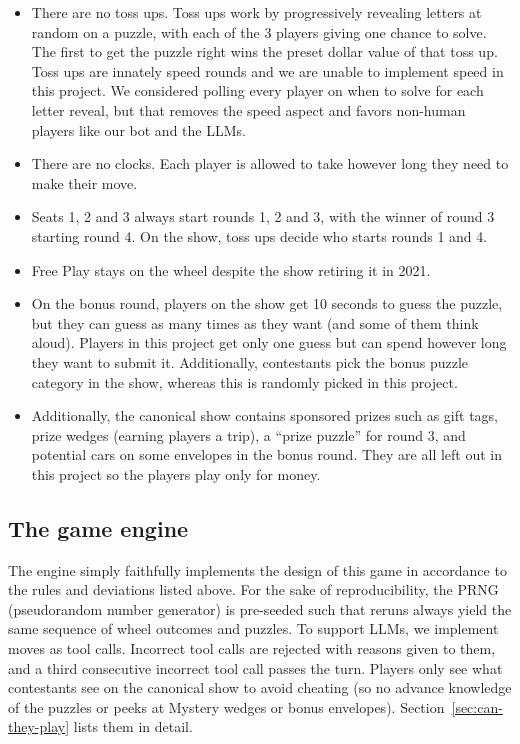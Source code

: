 \begin{itemize}
  \item There are no toss ups. Toss ups work by progressively revealing letters at random on a puzzle, with each of the 3 players giving one chance to solve. The first to get the puzzle right wins the preset dollar value of that toss up. Toss ups are innately speed rounds and we are unable to implement speed in this project. We considered polling every player on when to solve for each letter reveal, but that removes the speed aspect and favors non-human players like our bot and the LLMs.
  \item There are no clocks. Each player is allowed to take however long they need to make their move.
  \item Seats 1, 2 and 3 always start rounds 1, 2 and 3, with the winner of round 3 starting round 4. On the show, toss ups decide who starts rounds 1 and 4.
  \item Free Play stays on the wheel despite the show retiring it in 2021.
  \item On the bonus round, players on the show get 10 seconds to guess the puzzle, but they can guess as many times as they want (and some of them think aloud). Players in this project get only one guess but can spend however long they want to submit it. Additionally, contestants pick the bonus puzzle category in the show, whereas this is randomly picked in this project.
  \item Additionally, the canonical show contains sponsored prizes such as gift tags, prize wedges (earning players a trip), a ``prize puzzle'' for round 3, and potential cars on some envelopes in the bonus round. They are all left out in this project so the players play only for money.
\end{itemize}

\subsection{The game engine}

The engine simply faithfully implements the design of this game in accordance to the rules and deviations listed above. For the sake of reproducibility, the PRNG (pseudorandom number generator) is pre-seeded such that reruns always yield the same sequence of wheel outcomes and puzzles. To support LLMs, we implement moves as tool calls. Incorrect tool calls are rejected with reasons given to them, and a third consecutive incorrect tool call passes the turn. Players only see what contestants see on the canonical show to avoid cheating (so no advance knowledge of the puzzles or peeks at Mystery wedges or bonus envelopes). Section~\ref{sec:can-they-play} lists them in detail.

